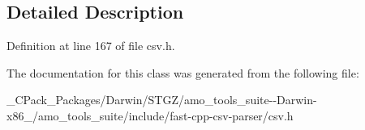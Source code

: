 \subsection{Detailed Description}


Definition at line 167 of file csv.\+h.



The documentation for this class was generated from the following file\+:\begin{DoxyCompactItemize}
\item 
\+\_\+\+C\+Pack\+\_\+\+Packages/\+Darwin/\+S\+T\+G\+Z/amo\+\_\+tools\+\_\+suite-\/-\/\+Darwin-\/x86\+\_/amo\+\_\+tools\+\_\+suite/include/fast-\/cpp-\/csv-\/parser/csv.\+h\end{DoxyCompactItemize}
